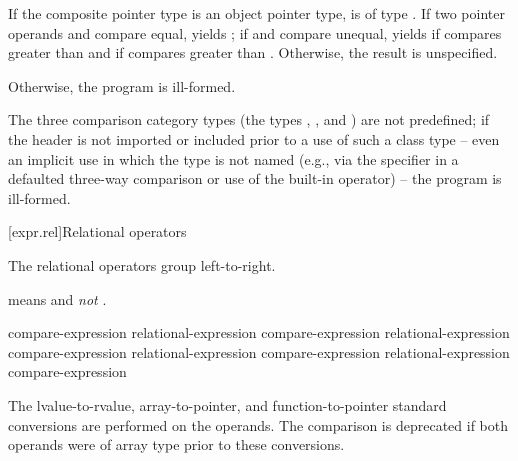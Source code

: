 \pnum
If the composite pointer type is an object pointer type,
 is of type .
If two pointer operands  and  compare equal,
 yields ;
if  and  compare unequal,
 yields
if  compares greater than 
and
if  compares greater than .
Otherwise, the result is unspecified.

\pnum
Otherwise, the program is ill-formed.

\pnum
The three comparison category types
(the types
,
, and
)
are not predefined;
if the header 
is not imported or included prior to a use of such a class type --
even an implicit use in which the type is not named
(e.g., via the  specifier
in a defaulted three-way comparison
or use of the built-in operator) -- the program is ill-formed.

[expr.rel]{Relational operators}%
%

\pnum
The relational operators group left-to-right.
\begin{example}
 means  and \emph{not}
.
\end{example}
%
%
%
%
%
%
%
%
%
\begin{bnf}
\br
    compare-expression\br
    relational-expression \terminal{<} compare-expression\br
    relational-expression \terminal{>} compare-expression\br
    relational-expression \terminal{<=} compare-expression\br
    relational-expression \terminal{>=} compare-expression
\end{bnf}
%
The
lvalue-to-rvalue,
array-to-pointer,
and function-to-pointer
standard conversions are performed on the operands.
The comparison is deprecated if
both operands were of array type
prior to these conversions.

